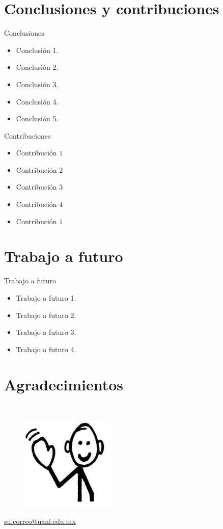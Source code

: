 \documentclass[9pt]{beamer}
\begin{document}
\section{Conclusiones y contribuciones}
	\begin{frame}{Conclusiones}
		\begin{itemize}
			\item Conclusión 1.
			\item Conclusión 2.
			\item Conclusión 3.
			\item Conclusión 4.
			\item Conclusión 5.
		\end{itemize}
	\end{frame}

	\begin{frame}{Contribuciones}
		\begin{itemize}
			\item Contribución $1$
			\item Contribución $2$
			\item Contribución $3$
			\item Contribución $4$
			\item Contribución $1$
		\end{itemize}
	\end{frame}

\section{Trabajo a futuro}
	\begin{frame}{Trabajo a futuro}
		\begin{itemize}
			\item Trabajo a futuro 1.
			\item Trabajo a futuro 2.
			\item Trabajo a futuro 3.
			\item Trabajo a futuro 4.
		\end{itemize}
	\end{frame}
\section{Agradecimientos}
	\begin{frame}
		 \\

		\begin{figure}
			\includegraphics[width=0.4\textwidth]{adios.jpg}
		\end{figure}

		\url{su.correo@uanl.edu.mx}
		
	\end{frame}
\end{document}
